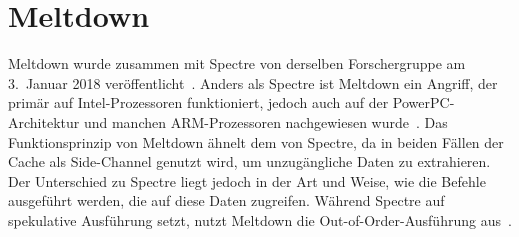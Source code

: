 \section{Meltdown}\label{sec:meltdown}

Meltdown wurde zusammen mit Spectre von derselben Forschergruppe am 3.~Januar 2018 veröffentlicht~\cite{kocher2018spectre}.
Anders als Spectre ist Meltdown ein Angriff, der primär auf Intel-Prozessoren funktioniert, jedoch auch auf der PowerPC-Architektur und manchen ARM-Prozessoren nachgewiesen wurde~\cite{cve_2024_45333}.
Das Funktionsprinzip von Meltdown ähnelt dem von Spectre, da in beiden Fällen der Cache als Side-Channel genutzt wird, um unzugängliche Daten zu extrahieren.
Der Unterschied zu Spectre liegt jedoch in der Art und Weise, wie die Befehle ausgeführt werden, die auf diese Daten zugreifen.
Während Spectre auf spekulative Ausführung setzt, nutzt Meltdown die Out-of-Order-Ausführung aus~\cite{kocher2018meltdown}.


